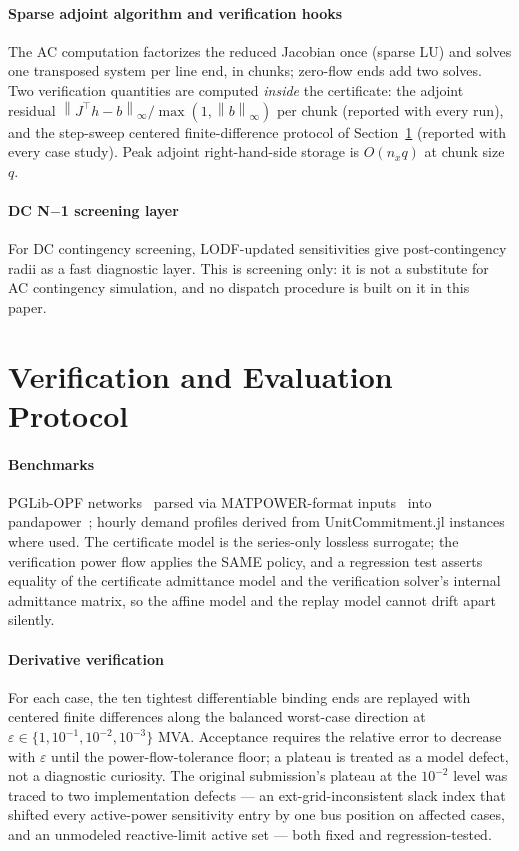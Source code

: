 \documentclass[11pt]{article}
\newcommand{\norm}[1]{\left\lVert #1 \right\rVert}
\begin{document}
\paragraph{Sparse adjoint algorithm and verification hooks}
The AC computation factorizes the reduced Jacobian once (sparse LU) and
solves one transposed system per line end, in chunks; zero-flow ends add two
solves.  Two verification quantities are computed \emph{inside} the
certificate: the adjoint residual
$\norm{J^\top h-b}_\infty/\max(1,\norm{b}_\infty)$ per chunk (reported with
every run), and the step-sweep centered finite-difference protocol of
Section~\ref{sec:evaluation} (reported with every case study).  Peak
adjoint right-hand-side storage is $O(n_x q)$ at chunk size $q$.

\paragraph{DC N$-$1 screening layer}
For DC contingency screening, LODF-updated sensitivities give
post-contingency radii as a fast diagnostic layer.  This is screening only:
it is not a substitute for AC contingency simulation, and no dispatch
procedure is built on it in this paper.

\section{Verification and Evaluation Protocol}
\label{sec:evaluation}

\paragraph{Benchmarks}
PGLib-OPF networks~\citep{PGLibOPF2019} parsed via
MATPOWER-format inputs~\citep{ZimmermanMurilloSanchezThomas2011} into
pandapower~\citep{ThurnerEtAl2018}; hourly demand profiles derived from
UnitCommitment.jl instances~\citep{UnitCommitmentJL2024} where used.  The
certificate model is the series-only lossless surrogate; the verification
power flow applies the SAME policy, and a regression test asserts equality
of the certificate admittance model and the verification solver's internal
admittance matrix, so the affine model and the replay model cannot drift
apart silently.

\paragraph{Derivative verification}
For each case, the ten tightest differentiable binding ends are replayed
with centered finite differences along the balanced worst-case direction at
$\varepsilon\in\{1,10^{-1},10^{-2},10^{-3}\}$ MVA.  Acceptance requires the
relative error to decrease with $\varepsilon$ until the power-flow-tolerance
floor; a plateau is treated as a model defect, not a diagnostic curiosity.
The original submission's plateau at the $10^{-2}$ level was traced to two
implementation defects --- an ext-grid-inconsistent slack index that shifted
every active-power sensitivity entry by one bus position on affected cases,
and an unmodeled reactive-limit active set --- both fixed and
regression-tested.
\end{document}
